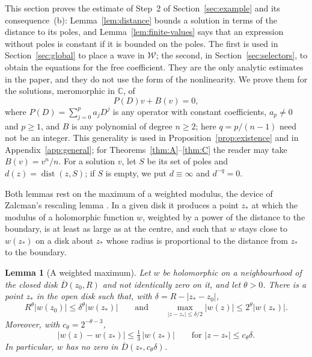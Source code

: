 \documentclass[11pt]{article}
\newtheorem{lemma}[theorem]{Lemma}
\theoremstyle{definition}
\theoremstyle{remark}
\numberwithin{equation}{section}
\newcommand{\CC}{\mathbb C}
\newcommand{\Wclass}{\mathcal W}
\DeclareMathOperator{\dist}{dist}
\begin{document}
This section proves the estimate of Step~2 of
Section~\ref{sec:example} and its consequence~(b):
Lemma~\ref{lem:distance} bounds a solution in terms of the distance to
its poles, and Lemma~\ref{lem:finite-values} says that an expression
without poles is constant if it is bounded on the poles. The first
is used in Section~\ref{sec:global} to place a wave in \(\Wclass\); the
second, in Section~\ref{sec:selectors}, to obtain the equations for the
free coefficient. They are the only analytic estimates in
the paper, and they do not use the form of the nonlinearity. We prove them for the solutions, meromorphic in \(\CC\),
of
\begin{equation}\label{eq:general-eq}
 P(D)v+B(v)=0,
\end{equation}
where \(P(D)=\sum_{j=0}^pa_jD^j\) is any operator with constant
coefficients, \(a_p\ne0\) and \(p\ge1\), and \(B\) is any polynomial of
degree \(n\ge2\); here \(q=p/(n-1)\) need not be an integer. This
generality is used in Proposition~\ref{prop:existence} and in
Appendix~\ref{app:general}; for Theorems~\ref{thm:A}--\ref{thm:C} the
reader may take \(B(v)=v^n/n\). For a solution \(v\), let \(S\) be its
set of poles and \(d(z)=\dist(z,S)\); if \(S\) is empty, we put
\(d\equiv\infty\) and \(d^{-q}=0\).

Both lemmas rest on the maximum of a weighted modulus, the device of
Zalcman's rescaling lemma \citep{Zalcman1975,Zalcman1998}. In a given
disk it produces a point \(z_*\) at which the modulus of a holomorphic
function \(w\), weighted by a power of the distance to the boundary, is
at least as large as at the centre, and such that \(w\) stays close to
\(w(z_*)\) on a disk about \(z_*\) whose radius is proportional to the
distance from \(z_*\) to the boundary.

\begin{lemma}[A weighted maximum]\label{lem:weighted}
Let \(w\) be holomorphic on a neighbourhood of the closed disk
\(\overline D(z_0,R)\) and not identically zero on it, and let
\(\theta>0\). There is a point \(z_*\) in the open disk such that, with
\(\delta=R-|z_*-z_0|\),
\[
 R^\theta|w(z_0)|\le \delta^\theta|w(z_*)|
 \qquad\text{and}\qquad
 \max_{|z-z_*|\le \delta/2}|w(z)|\le 2^\theta|w(z_*)|.
\]
Moreover, with \(c_\theta=2^{-\theta-3}\),
\[
 |w(z)-w(z_*)|\le\tfrac13\,|w(z_*)|
 \qquad\text{for } |z-z_*|\le c_\theta\delta .
\]
In particular, \(w\) has no zero in \(\overline D(z_*,c_\theta\delta)\).
\end{lemma}
\end{document}
